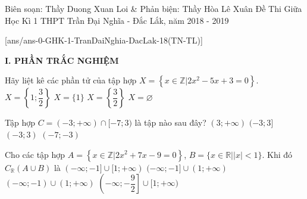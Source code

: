 \begin{name}
{Biên soạn: Thầy Duong Xuan Loi \& Phản biện: Thầy Hòa Lê Xuân}
{Đề Thi Giữa Học Kì 1 THPT Trần Đại Nghĩa - Đắc Lắk, năm 2018 - 2019}
\end{name}

\setcounter{ex}{0}\setcounter{bt}{0}
[ans/ans-0-GHK-1-TranDaiNghia-DacLak-18(TN-TL)]

\noindent\textbf{I. PHẦN TRẮC NGHIỆM}

\begin{ex}%
	Hãy liệt kê các phần tử của tập hợp $X = \left\{ x \in \mathbb{Z} | 2x^2-5x+3=0 \right\}$.
	\choice
	{$X = \left\{1;\dfrac{3}{2} \right\}$}
	{\True $X = \{ 1 \}$}
	{$X = \left\{ \dfrac{3}{2} \right\}$}
	{$X = \varnothing$}
\end{ex}

\begin{ex}%
	Tập hợp $C=(-3; +\infty) \cap [-7; 3)$ là tập nào sau đây?
	\choice
	{$(3; +\infty)$}
	{$(-3; 3]$}
	{\True $(-3; 3)$}
	{$(-7; -3)$}
	\loigiai{
		$C=(-3; +\infty) \cap [-7; 3)=(-3; 3)$.
	}
\end{ex}

\begin{ex}%
	Cho các tập hợp $A=\left\{ x\in \mathbb{Z}| 2x^2+7x-9=0 \right\}$, $B=\{ x\in \mathbb{R}| |x| < 1 \}$. Khi đó $C_{\mathbb{R}} (A \cup B)$ là
	\choice
	{$(-\infty; -1] \cup [1; +\infty)$}
	{\True $(-\infty; -1] \cup (1; +\infty)$}
	{$(-\infty; -1) \cup (1; +\infty)$}
	{$\left(-\infty;-\dfrac{9}{2}\right] \cup [1; +\infty )$}
	\loigiai{
		Ta có $2x^2+7x-9=0 \Leftrightarrow \hoac{& x=1\in \mathbb{Z} \\ & x=-\dfrac{9}{2}\notin \mathbb{Z}}$ nên $A=\{1\}$.\\
		$B=\{ x\in \mathbb{R}| |x| < 1 \}= ( -1;1 )$, $A \cup B=(-1;1]$.\\
		$C_{\mathbb{R}} (A \cup B)=( -\infty; -1 ] \cup ( 1; +\infty )$.
	}
\end{ex}

